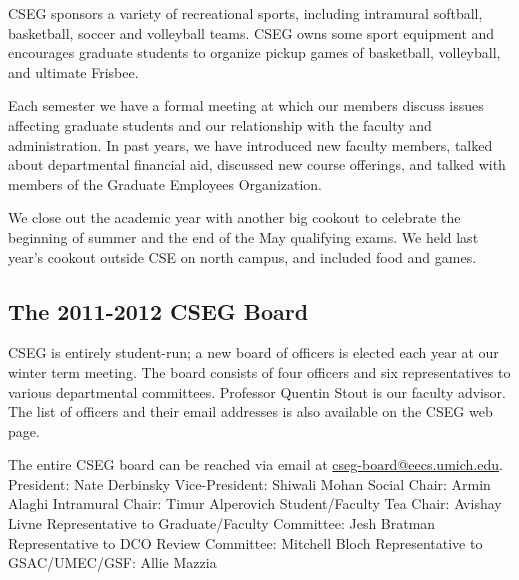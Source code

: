 \documentclass[11pt]{article}
\begin{document}
CSEG sponsors a variety of recreational sports, including intramural softball, basketball, soccer and
volleyball teams. CSEG owns some sport equipment and encourages graduate students to organize pickup
games of basketball, volleyball, and ultimate Frisbee.

Each semester we have a formal meeting at which our members discuss issues affecting graduate students
and our relationship with the faculty and administration. In past years, we have introduced new faculty
members, talked about departmental financial aid, discussed new course offerings, and talked with members
of the Graduate Employees Organization.

We close out the academic year with another big cookout to celebrate the beginning of summer and the end
of the May qualifying exams. We held last year's cookout outside CSE on north campus, and included food
and games.
\subsection{The 2011-2012 CSEG Board}
\label{sec-2_2}

CSEG is entirely student-run; a new board of officers is elected each year at our winter term meeting. The
board consists of four officers and six representatives to various departmental committees. Professor
Quentin Stout is our faculty advisor. The list of officers and their email addresses is also available on the
CSEG web page.

The entire CSEG board can be reached via email at
\href{mailto:cseg-board@eecs.umich.edu}{cseg-board@eecs.umich.edu}.
President:  Nate Derbinsky
Vice-President:  Shiwali Mohan
Social Chair:  Armin Alaghi
Intramural Chair:  Timur Alperovich
Student/Faculty Tea Chair:  Avishay Livne
Representative to Graduate/Faculty Committee:  Jesh Bratman
Representative to DCO Review Committee:  Mitchell Bloch
Representative to GSAC/UMEC/GSF:  Allie Mazzia
\end{document}
